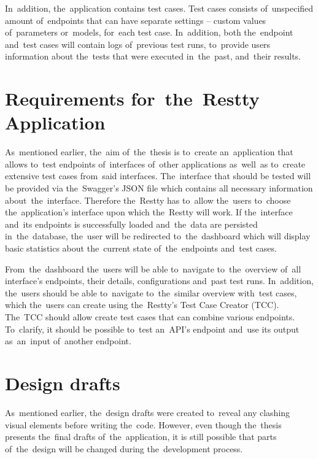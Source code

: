 In~addition, the~application contains test cases. Test cases consists of~unspecified amount of~endpoints that can have
separate settings -- custom values of~parameters or~models, for~each test case. In~addition, both the~endpoint and~test cases will contain
logs of~previous test runs, to~provide users information about the~tests that were executed in~the~past, and~their results.


\section{Requirements for~the~Restty Application}
As~mentioned earlier, the~aim of~the~thesis is to~create an~application that
allows to~test endpoints of~interfaces of~other applications
as~well~as to~create extensive test cases from~said interfaces. The~interface
that should be tested will be provided via the~Swagger's JSON file which
contains all necessary information about~the~interface. Therefore the~Restty has
to~allow the~users to~choose the~application's interface upon which the~Restty will work.
 If the~interface and~its endpoints is successfully loaded
and~the~data are persisted in~the~database, the~user will be
redirected to~the~dashboard which will display basic statistics about
the~current state of~the~endpoints and~test cases.

From~the~dashboard the~users will be able to~navigate to~the~overview of~all
interface's endpoints, their details, configurations and~past test runs.
In~addition, the~users should be able to~navigate to~the~similar overview
with~test cases, which the~users can create using the~Restty's Test Case
Creator (TCC). The~TCC should allow create test cases that can combine various
endpoints. To~clarify, it should be possible to~test
an~API's endpoint and~use its output as~an~input of~another endpoint.

\section{Design drafts}
As~mentioned earlier, the~design drafts were created to~reveal any clashing visual
elements before writing the~code. However, even though the~thesis presents the~final drafts
of~the~application, it is still possible that parts of~the~design will be changed during
the~development process.


